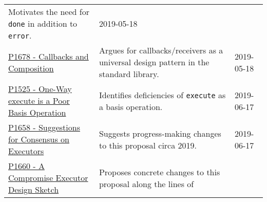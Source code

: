 \documentclass[a4paper,12pt,notitlepage,twoside,openright]{article}
\begin{document}
\begin{longtable}[]{@{}lll@{}}
\begin{minipage}[t]{0.54\columnwidth}
Motivates the need for \texttt{done} in addition to
\texttt{error}.\strut
\end{minipage} & \begin{minipage}[t]{0.05\columnwidth}\raggedright
2019-05-18\strut
\end{minipage}\tabularnewline
\begin{minipage}[t]{0.32\columnwidth}\raggedright
\href{https://wg21.link/P1678}{P1678 - Callbacks and Composition}\strut
\end{minipage} & \begin{minipage}[t]{0.54\columnwidth}\raggedright
Argues for callbacks/receivers as a universal design pattern in the
standard library.\strut
\end{minipage} & \begin{minipage}[t]{0.05\columnwidth}\raggedright
2019-05-18\strut
\end{minipage}\tabularnewline
\begin{minipage}[t]{0.32\columnwidth}\raggedright
\href{https://wg21.link/P1525}{P1525 - One-Way execute is a Poor Basis
Operation}\strut
\end{minipage} & \begin{minipage}[t]{0.54\columnwidth}\raggedright
Identifies deficiencies of \texttt{execute} as a basis
operation.\strut
\end{minipage} & \begin{minipage}[t]{0.05\columnwidth}\raggedright
2019-06-17\strut
\end{minipage}\tabularnewline
\begin{minipage}[t]{0.32\columnwidth}\raggedright
\href{https://wg21.link/P1658}{P1658 - Suggestions for Consensus on
Executors}\strut
\end{minipage} & \begin{minipage}[t]{0.54\columnwidth}\raggedright
Suggests progress-making changes to this proposal circa 2019.\strut
\end{minipage} & \begin{minipage}[t]{0.05\columnwidth}\raggedright
2019-06-17\strut
\end{minipage}\tabularnewline
\begin{minipage}[t]{0.32\columnwidth}\raggedright
\href{https://wg21.link/P1660}{P1660 - A Compromise Executor Design
Sketch}\strut
\end{minipage} & \begin{minipage}[t]{0.54\columnwidth}\raggedright
Proposes concrete changes to this proposal along the lines of

\end{minipage}
\end{longtable}
\end{document}
